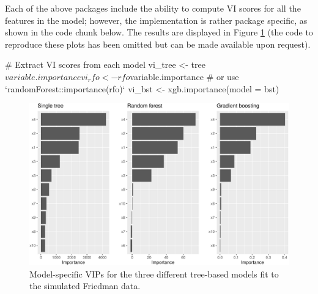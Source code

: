 \begin{Schunk}
\end{Schunk}

Each of the above packages include the ability to compute VI scores for
all the features in the model; however, the implementation is rather
package specific, as shown in the code chunk below. The results are
displayed in Figure \ref{fig:vi-plots} (the code to reproduce these
plots has been omitted but can be made available upon request).

\begin{Schunk}
\begin{Sinput}
# Extract VI scores from each model
vi_tree <- tree$variable.importance
vi_rfo <- rfo$variable.importance  # or use `randomForest::importance(rfo)`
vi_bst <- xgb.importance(model = bst)
\end{Sinput}
\end{Schunk}

\begin{Schunk}
\begin{figure}[!htb]

{\centering \includegraphics[width=1\linewidth]{greenwell-boehmke_files/figure-latex/vi-plots-1} 

}

\caption[Model-specific VIPs for the three different tree-based models fit to the simulated Friedman data]{Model-specific VIPs for the three different tree-based models fit to the simulated Friedman data.}\label{fig:vi-plots}
\end{figure}
\end{Schunk}


